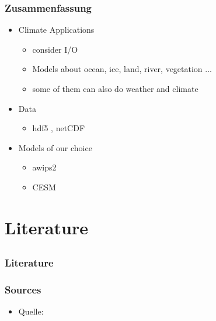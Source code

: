 \documentclass[compress]{beamer}
\begin{document}
\begin{frame}
	\frametitle{Zusammenfassung}

	\begin{itemize}
	
		\item Climate Applications
		\begin{itemize}
			\item consider I/O
			\item Models about ocean, ice, land, river, vegetation ...
			\item some of them can also do weather and climate
		\end{itemize}
	
		\item Data
		\begin{itemize}
			\item hdf5 , netCDF
		\end{itemize}
		
		\item Models of our choice
		\begin{itemize}
			\item awips2
			\item CESM
		\end{itemize}
		
		
	\end{itemize}
\end{frame}

\section*{Literature}
\subsection*{}

\begin{frame}
	\frametitle{Literature}
    \frametitle{Sources}
    \begin{itemize}
    	\item Quelle: \cite{Quelle2012}
    \end{itemize}

	
	
\end{frame}
\end{document}
